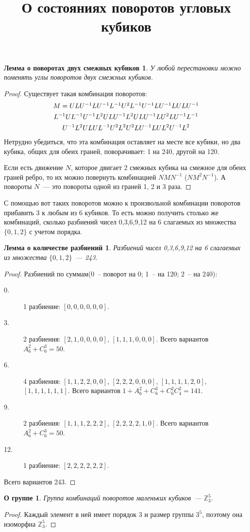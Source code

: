 \documentclass[utf8,a4paper,draft]{article}
\title{О состояниях поворотов угловых кубиков}
\author{}
\date{}
\newtheorem*{lemma1}{Лемма о поворотах двух смежных кубиков}
\newtheorem*{lemma2}{Лемма о количестве разбиений}
\newtheorem*{lemma3}{О группе}
\begin{document}
\maketitle
\begin{lemma1}
У любой перестановки можно поменять углы поворотов двух смежных кубиков.
\end{lemma1}
\begin{proof}
Существует такая комбинация поворотов:
\begin{multline*}
$$
M = ULU^{-1}LU^{-1}L^{-1}U^2L^{-1}U^{-1}LU^{-1}LULU^{-1}       \\
    L^{-1}UL^{-1}U^{-1}L^2ULU^{-1}L^2ULU^{-1}LU^2LU^{-1}L^{-1} \\
    U^{-1}L^2ULUL^{-1}U^2L^2U^2LU^{-1}LUL^2U^{-1}L^2
$$
\end{multline*}
    Нетрудно убедиться, что эта комбинация оставляет на месте все кубики, но
два кубика, общих для обеих граней, поворачивает: 1 на 240\textdegree, другой
на 120\textdegree.

    Если есть движение $N$, которое двигает 2 смежных кубика на смежное для обеих граней ребро,
то их можно повернуть комбинацией $NMN^{-1}$ ($NM^2N^{-1}$).
    А повороты $N$~--- это повороты одной из граней 1, 2 и 3 раза.
\end{proof}
С помощью вот таких поворотов можно к произвольной комбинации поворотов
прибавить 3 к любым из 6 кубиков. То есть можно получить столько же комбинаций,
сколько разбиений чисел 0,3,6,9,12 на 6 слагаемых из множества $\{0,1,2\}$ с
учетом порядка.
\begin{lemma2}
    Разбиений чисел 0,3,6,9,12 на 6 слагаемых из множества $\{0,1,2\}$~--- 243.
\end{lemma2}
\begin{proof}
    Разбиений по суммам(0~-- поворот на 0\textdegree; 1~-- на 120\textdegree; 2~-- на 240\textdegree):
    \begin{description}
    \item[0.] 1 разбиение: $[0,0,0,0,0,0]$.
    \item[3.] 2 разбиения: $[2,1,0,0,0,0]$, $[1,1,1,0,0,0]$. Всего вариантов
        $A^2_6+C^3_6=50$.
    \item[6.] 4 разбиения: $[1,1,2,2,0,0]$, $[2,2,2,0,0,0]$, $[1,1,1,1,2,0]$,
        $[1,1,1,1,1,1]$. Всего вариантов $1+A^2_6+C^3_6+C^2_6C^2_4=141$.
    \item[9.] 2 разбиения: $[1,1,1,2,2,2]$, $[2,2,2,2,1,0]$. Всего вариантов
        $A^2_6+C^3_6=50$.
    \item[12.]1 разбиение: $[2,2,2,2,2,2]$.
    \end{description}
    Всего вариантов 243.
\end{proof}
\begin{lemma3}
Группа комбинаций поворотов маленьких кубиков~--- $\mathbb{Z}_3^5$.
\end{lemma3}
\begin{proof}
    Каждый элемент в ней имеет порядок 3 и размер группы $3^5$, поэтому она изоморфна $\mathbb{Z}_3^5$.
\end{proof}
\end{document}
